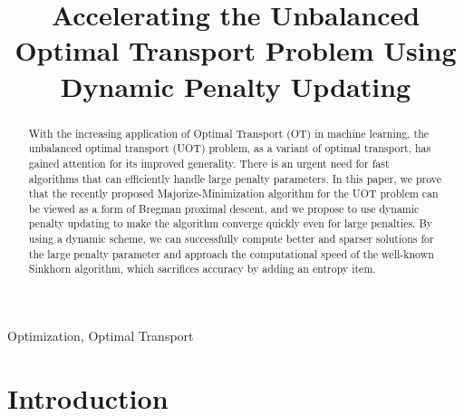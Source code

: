 \documentclass[conference]{IEEEtran}
\begin{document}
\title{Accelerating the Unbalanced Optimal Transport Problem Using Dynamic Penalty Updating
}

\author{
\and
{}

}

\maketitle

\begin{abstract}
With the increasing application of Optimal Transport (OT) in machine learning, the unbalanced optimal transport (UOT) problem, as a variant of optimal transport, has gained attention for its improved generality. There is an urgent need for fast algorithms that can efficiently handle large penalty parameters. In this paper, we prove that the recently proposed Majorize-Minimization algorithm for the UOT problem can be viewed as a form of Bregman proximal descent, and we propose to use dynamic penalty updating to make the algorithm converge quickly even for large penalties. By using a dynamic scheme, we can successfully compute better and sparser solutions for the large penalty parameter and approach the computational speed of the well-known Sinkhorn algorithm, which sacrifices accuracy by adding an entropy item.
\end{abstract}

\begin{IEEEkeywords}
Optimization, Optimal Transport
\end{IEEEkeywords}

\section{Introduction}
\label{sec:int}
\end{document}
